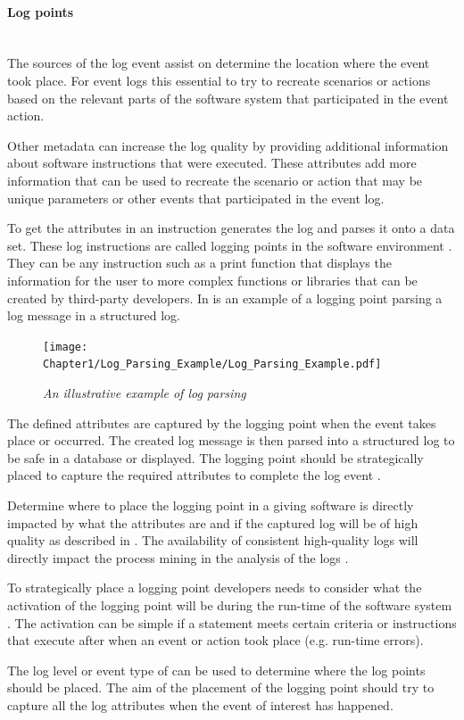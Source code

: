 \paragraph{Log points}\leavevmode\\
The sources of the log event assist on determine the location where the event took place. For event logs this essential to try to recreate scenarios or actions based on the relevant parts of the software system that participated in the event action.\par Other metadata can increase the log quality by providing additional information about software instructions that were executed. These attributes add more information that can be used to recreate the scenario or action that may be unique parameters or other events that participated in the event log.\par To get the attributes in  an instruction generates the log and parses it onto a data set. These log instructions are called logging points in the software environment \cite{Pecchia2015, Zhu2015}. They can be any instruction such as a print function that displays the information for the user to more complex functions or libraries that can be created by third-party developers. In  is an example of a logging point parsing a log message in a structured log. 

\begin{figure}[!htb]
	\centering %
	\texttt{[image: Chapter1/Log\_Parsing\_Example/Log\_Parsing\_Example.pdf]}
	\caption[An illustrative example of log parsing]
	{\textit{An illustrative example of log parsing \cite{Zhu2019}}} \label{fig:ch1_logParsing}
\end{figure}

The defined attributes are captured by the logging point when the event takes place or occurred. The created log message is then parsed into a structured log to be safe in a database or displayed. The logging point should be strategically placed to capture the required attributes to complete the log event \cite{Fedaghi2010}.\par Determine where to place the logging point in a giving software is directly impacted by what the attributes are and if the captured log will be of high quality as described in . The availability of consistent high-quality logs will directly impact the process mining in the analysis of the logs \cite{Kherbouche2017}.\par To strategically place a logging point developers needs to consider what the activation of the logging point will be during the run-time of the software system \cite{Pecchia2015, Cinque2013}. The activation can be simple if a statement meets certain criteria or instructions that execute after when an event or action took place (e.g. run-time errors). \par The log level or event type of  can be used to determine where the log points should be placed. The aim of the placement of the logging point should try to capture all the log attributes when the event of interest has happened.

